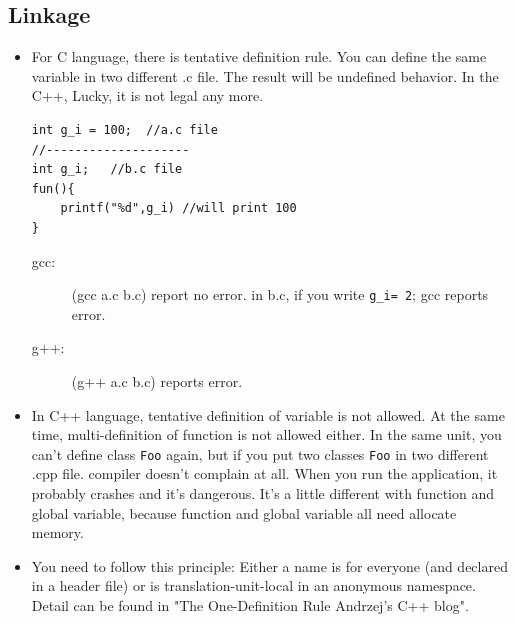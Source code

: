 \documentclass[a4paper,11pt,twoside]{book}
\begin{document}
\subsection{Linkage}

\begin{itemize}
	\item For C language, there is tentative definition rule. You can define the same variable in two different .c file. The result will be undefined behavior. In the C++, Lucky, it is not legal any more. 
	
\begin{lstlisting}[numbers=none]
int g_i = 100;  //a.c file
//--------------------
int g_i;   //b.c file
fun(){
	printf("%d",g_i) //will print 100
}
\end{lstlisting}
	\begin{description}
		\item[gcc:] (gcc a.c b.c) report no error. in b.c, if you write \texttt{g\_i= 2}; gcc reports error.
		\item[g++:] (g++ a.c b.c) reports error.
	\end{description}

	\item In C++ language, tentative definition of variable is not allowed. At the same time, multi-definition of function is not allowed either. In the same unit, you can't define class \texttt{Foo} again, but if you put two classes \texttt{Foo} in two different .cpp file. compiler doesn't complain at all. When you run the application, it probably crashes and it's dangerous. It's a little different with function and global variable, because function and global variable all need allocate memory.
	
	\item You need to follow this principle: Either a name is for everyone (and declared in a header file) or is translation-unit-local in an anonymous namespace. Detail can be found in "The One-Definition Rule  Andrzej's C++ blog".
\end{itemize}
\end{document}
